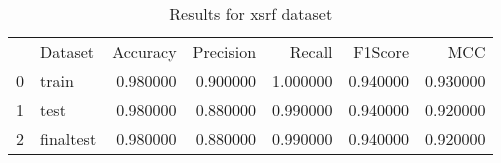 \begin{table}
\caption{Results for xsrf dataset}
\begin{tabular}{llrrrrr}
 & Dataset & Accuracy & Precision & Recall & F1Score & MCC \\
0 & train & 0.980000 & 0.900000 & 1.000000 & 0.940000 & 0.930000 \\
1 & test & 0.980000 & 0.880000 & 0.990000 & 0.940000 & 0.920000 \\
2 & finaltest & 0.980000 & 0.880000 & 0.990000 & 0.940000 & 0.920000 \\
\end{tabular}
\end{table}
